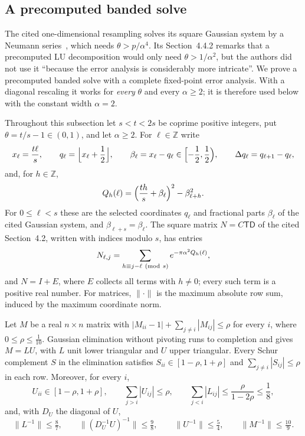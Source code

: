 \subsection{A precomputed banded solve}
\label{sec:banded-solve}
The cited one-dimensional resampling solves its square Gaussian system by a
Neumann series~\cite[Lemma~4.12]{HarveyHoeven2021}, which needs
$\theta>p/\alpha^4$. Its Section~4.4.2 remarks that a precomputed LU
decomposition would only need $\theta>1/\alpha^2$, but the authors did not use
it ``because the error analysis is considerably more intricate''. We prove a
precomputed banded solve with a complete fixed-point error analysis. With a
diagonal rescaling it works for \emph{every} $\theta$ and every
$\alpha\ge2$; it is therefore used below with the constant width $\alpha=2$.

Throughout this subsection let $s<t<2s$ be coprime positive integers, put
$\theta=t/s-1\in(0,1)$, and let $\alpha\ge2$. For $\ell\in\mathbb Z$ write
\[
 x_\ell=\frac{t\ell}s,\qquad q_\ell=\Bigl\lfloor x_\ell+\frac12\Bigr\rfloor,
 \qquad \beta_\ell=x_\ell-q_\ell\in\Bigl[-\frac12,\frac12\Bigr),
 \qquad \Delta q_\ell=q_{\ell+1}-q_\ell,
\]
and, for $h\in\mathbb Z$,
\[
 Q_h(\ell)=\Bigl(\frac{th}s+\beta_\ell\Bigr)^2-\beta_{\ell+h}^2 .
\]
For $0\le\ell<s$ these are the selected coordinates $q_\ell$ and fractional
parts $\beta_\ell$ of the cited Gaussian system, and $\beta_{\ell+s}=\beta_\ell$.
The square matrix $N=C\mathsf T\mathsf D$ of the cited
Section~4.2, written with indices modulo $s$, has entries
\[
 N_{\ell,j}=\sum_{h\equiv j-\ell\ ({\rm mod}\ s)}e^{-\pi\alpha^2Q_h(\ell)} ,
\]
and $N=I+E$, where $E$ collects all terms with $h\ne0$; every such term is a
positive real number. For matrices, $\|\cdot\|$ is the maximum absolute row
sum, induced by the maximum coordinate norm.

\begin{lemma}\label{lem:dominant-lu}
Let $M$ be a real $n\times n$ matrix with
$|M_{ii}-1|+\sum_{j\ne i}|M_{ij}|\le\rho$ for every $i$, where
$0\le\rho\le\frac1{10}$. Gaussian elimination without pivoting runs to
completion and gives $M=LU$, with $L$ unit lower triangular and $U$ upper
triangular. Every Schur complement $S$ in the elimination satisfies
$S_{ii}\in[1-\rho,1+\rho]$ and $\sum_{j\ne i}|S_{ij}|\le\rho$ in each row.
Moreover, for every $i$,
\[
 U_{ii}\in[1-\rho,1+\rho],\qquad \sum_{j>i}|U_{ij}|\le\rho,\qquad
 \sum_{j<i}|L_{ij}|\le\frac{\rho}{1-2\rho}\le\frac18,
\]
and, with $D_U$ the diagonal of $U$,
\[
 \|L^{-1}\|\le\tfrac87,\qquad\|(D_U^{-1}U)^{-1}\|\le\tfrac98,\qquad
 \|U^{-1}\|\le\tfrac54,\qquad\|M^{-1}\|\le\tfrac{10}9 .
\]
\end{lemma}

